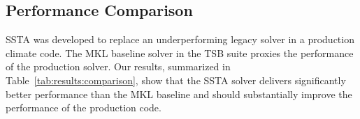 \documentclass{sig-alternate-05-2015}
\begin{document}

\subsection{Performance Comparison}
\label{sec:results:comparison}


SSTA was developed to replace an underperforming legacy solver in a production
  climate code.
The MKL baseline solver in the TSB suite proxies the performance of the
  production solver. 
Our results, summarized in Table~\ref{tab:results:comparison}, show that the
  SSTA solver delivers significantly better performance than the MKL baseline
  and should substantially improve the performance of the production code.

\end{document}

